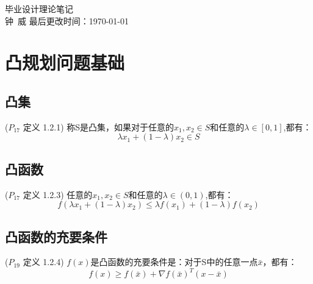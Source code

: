 \documentclass[]{article}
\begin{document}
\begin{titlepage}
\begin{center}
\LARGE 毕业设计理论笔记\\
[2.5cm]
\large{钟\ 威}
\vfill
\large 最后更改时间：\today
\end{center}
\end{titlepage}

\section{凸规划问题基础}

\subsection{凸集} 
($P_{17}$ 定义 1.2.1) 
\quad 称S是凸集，如果对于任意的$x_1,x_2 \in S$和任意的$\lambda \in [0,1]$,都有：
$$ {\lambda}x_1 + (1 - {\lambda})x_2 \in S $$

\subsection{凸函数}
($P_{17}$ 定义 1.2.3)
\quad 任意的$ x_1,x_2 \in S $和任意的$ \lambda \in (0,1)$,都有：
$$ f({\lambda}x_1 + (1 - \lambda)x_2) \le {\lambda}f(x_1) + (1 - \lambda)f(x_2)$$

\subsection{凸函数的充要条件}
($P_{19}$ 定义 1.2.4)
\quad $f(x)$是凸函数的充要条件是：对于S中的任意一点$\bar{x}$，都有：
$$ f(x) \ge f(\bar{x}) + \nabla f(\bar{x})^T(x-\bar{x}) $$
\end{document}
